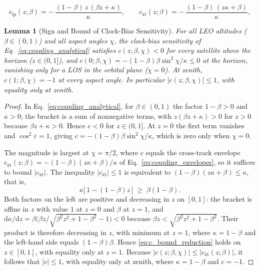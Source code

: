 \documentclass[10pt,a4paper]{amsart}
\newtheorem{lemma}{Lemma}
\begin{document}
\begin{equation}\label{eq:coupling_envelopes}
c_{\mathrm{ip}}(z;\beta) = -\,\frac{(1-\beta)\,z\,(\beta z+\kappa)}{\kappa},
\qquad
c_{\mathrm{xt}}(z;\beta) = -\,\frac{(1-\beta)\,(z\kappa+\beta)}{\kappa},
\end{equation}

\begin{lemma}[Sign and Bound of Clock-Bias Sensitivity]\label{lem:c_negative}
For all LEO altitudes ($\beta \in (0,1)$) and all aspect angles $\chi$, the clock-bias sensitivity of Eq.~\eqref{eq:coupling_analytical} satisfies $c(z;\beta,\chi) < 0$ for every satellite above the horizon ($z \in (0,1]$), and $c(0;\beta,\chi) = -(1-\beta)\beta\sin^2\chi/\kappa \le 0$ at the horizon, vanishing only for a LOS in the orbital plane ($\chi = 0$). At zenith, $c(1;\beta,\chi) = -1$ at every aspect angle. In particular $|c(z;\beta,\chi)| \le 1$, with equality only at zenith.
\end{lemma}

\begin{proof}
In Eq.~\eqref{eq:coupling_analytical}, for $\beta \in (0,1)$ the factor $1-\beta > 0$ and $\kappa > 0$; the bracket is a sum of nonnegative terms, with $z(\beta z+\kappa) > 0$ for $z > 0$ because $\beta z+\kappa > 0$. Hence $c < 0$ for $z \in (0,1]$. At $z = 0$ the first term vanishes and $\cos^2\varepsilon = 1$, giving $c = -(1-\beta)\beta\sin^2\chi/\kappa$, which is zero only when $\chi = 0$.

The magnitude is largest at $\chi = \pi/2$, where $c$ equals the cross-track envelope $c_{\mathrm{xt}}(z;\beta) = -(1-\beta)(z\kappa+\beta)/\kappa$ of Eq.~\eqref{eq:coupling_envelopes}, so it suffices to bound $|c_{\mathrm{xt}}|$. The inequality $|c_{\mathrm{xt}}| \le 1$ is equivalent to $(1-\beta)(z\kappa+\beta) \le \kappa$, that is,
%
\begin{equation}\label{eq:c_bound_reduction}
\kappa\bigl[\,1 - (1-\beta)z\,\bigr] \;\ge\; \beta(1-\beta) .
\end{equation}
%
Both factors on the left are positive and decreasing in $z$ on $[0,1]$: the bracket is affine in $z$ with value $1$ at $z = 0$ and $\beta$ at $z = 1$, and $\mathrm{d}\kappa/\mathrm{d}z = \beta\bigl(\beta z/\sqrt{\beta^2 z^2 + 1 - \beta^2} - 1\bigr) < 0$ because $\beta z < \sqrt{\beta^2 z^2 + 1 - \beta^2}$. Their product is therefore decreasing in $z$, with minimum at $z = 1$, where $\kappa = 1-\beta$ and the left-hand side equals $(1-\beta)\beta$. Hence \eqref{eq:c_bound_reduction} holds on $z \in [0,1]$, with equality only at $z = 1$. Because $|c(z;\beta,\chi)| \le |c_{\mathrm{xt}}(z;\beta)|$, it follows that $|c| \le 1$, with equality only at zenith, where $\kappa = 1-\beta$ and $c = -1$.
\end{proof}
\end{document}
